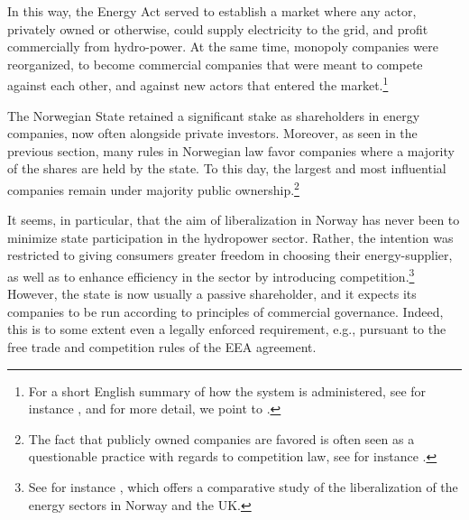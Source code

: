 In this way, the Energy Act served to establish a market where any actor, privately owned or otherwise, could supply electricity to the grid, and profit commercially from hydro-power. At the same time, monopoly companies were reorganized, to become commercial companies that were meant to compete against each other, and against new actors that entered the market.\footnote{For a short English summary of how the system is administered, see for instance \cite[p.29-30]{ar2010}, and for more detail, we point to \cite{Hammer2}.}

The Norwegian State retained a significant stake as shareholders in energy companies, now often alongside private investors. Moreover, as seen in the previous section, many rules in Norwegian law favor companies where a majority of the shares are held by the state. To this day, the largest and most influential companies remain under majority public ownership.\footnote{The fact that publicly owned companies are favored is often seen as a questionable practice with regards to competition law, see for instance \cite{efta07}.} 


It seems, in particular, that the aim of liberalization in Norway has never been to minimize state participation in the hydropower sector. Rather, the intention was restricted to giving consumers greater freedom in choosing their energy-supplier, as well as to enhance efficiency in the sector by introducing competition.\footnote{See for instance \cite{liberal}, which offers a comparative study of the liberalization of the energy sectors in Norway and the UK.} However, the state is now usually a passive shareholder, and it expects its companies to be run according to principles of commercial governance. Indeed, this is to some extent even a legally enforced requirement, e.g., pursuant to the free trade and competition rules of the EEA agreement.

